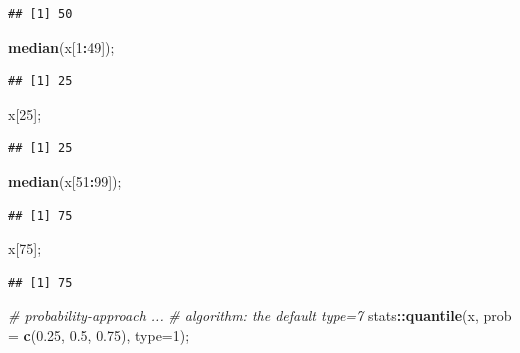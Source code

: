 \documentclass[
]{article}
\newenvironment{Shaded}{\begin{snugshade}}{\end{snugshade}}
\newcommand{\CommentTok}[1]{\textcolor[rgb]{0.56,0.35,0.01}{\textit{#1}}}
\newcommand{\DataTypeTok}[1]{\textcolor[rgb]{0.13,0.29,0.53}{#1}}
\newcommand{\DecValTok}[1]{\textcolor[rgb]{0.00,0.00,0.81}{#1}}
\newcommand{\FloatTok}[1]{\textcolor[rgb]{0.00,0.00,0.81}{#1}}
\newcommand{\KeywordTok}[1]{\textcolor[rgb]{0.13,0.29,0.53}{\textbf{#1}}}
\newcommand{\NormalTok}[1]{#1}
\newcommand{\OperatorTok}[1]{\textcolor[rgb]{0.81,0.36,0.00}{\textbf{#1}}}
\begin{document}
\begin{verbatim}
## [1] 50
\end{verbatim}

\begin{Shaded}
\begin{Highlighting}[]
\KeywordTok{median}\NormalTok{(x[}\DecValTok{1}\OperatorTok{:}\DecValTok{49}\NormalTok{]);}
\end{Highlighting}
\end{Shaded}

\begin{verbatim}
## [1] 25
\end{verbatim}

\begin{Shaded}
\begin{Highlighting}[]
\NormalTok{x[}\DecValTok{25}\NormalTok{];}
\end{Highlighting}
\end{Shaded}

\begin{verbatim}
## [1] 25
\end{verbatim}

\begin{Shaded}
\begin{Highlighting}[]
\KeywordTok{median}\NormalTok{(x[}\DecValTok{51}\OperatorTok{:}\DecValTok{99}\NormalTok{]);}
\end{Highlighting}
\end{Shaded}

\begin{verbatim}
## [1] 75
\end{verbatim}

\begin{Shaded}
\begin{Highlighting}[]
\NormalTok{x[}\DecValTok{75}\NormalTok{];}
\end{Highlighting}
\end{Shaded}

\begin{verbatim}
## [1] 75
\end{verbatim}

\begin{Shaded}
\begin{Highlighting}[]
\CommentTok{\# probability{-}approach ... }
\CommentTok{\# algorithm: the default type=7}
\NormalTok{stats}\OperatorTok{::}\KeywordTok{quantile}\NormalTok{(x, }\DataTypeTok{prob =} \KeywordTok{c}\NormalTok{(}\FloatTok{0.25}\NormalTok{, }\FloatTok{0.5}\NormalTok{, }\FloatTok{0.75}\NormalTok{), }\DataTypeTok{type=}\DecValTok{1}\NormalTok{);}
\end{Highlighting}
\end{Shaded}
\end{document}
